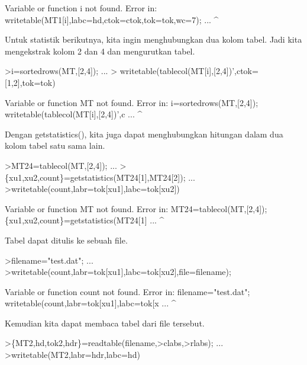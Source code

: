 \documentclass[a4paper,10pt]{article}
\begin{document}
\begin{eulernotebook}
\begin{euleroutput}
  Variable or function i not found.
  Error in:
  writetable(MT1[i],labc=hd,ctok=ctok,tok=tok,wc=7); ...
                  ^
\end{euleroutput}
\begin{eulercomment}
Untuk statistik berikutnya, kita ingin menghubungkan dua kolom tabel.
Jadi kita mengekstrak kolom 2 dan 4 dan mengurutkan tabel.
\end{eulercomment}
\begin{eulerprompt}
>i=sortedrows(MT,[2,4]);  ...
>  writetable(tablecol(MT[i],[2,4])',ctok=[1,2],tok=tok)
\end{eulerprompt}
\begin{euleroutput}
  Variable or function MT not found.
  Error in:
  i=sortedrows(MT,[2,4]);    writetable(tablecol(MT[i],[2,4])',c ...
                 ^
\end{euleroutput}
\begin{eulercomment}
Dengan getstatistics(), kita juga dapat menghubungkan hitungan dalam
dua kolom tabel satu sama lain.
\end{eulercomment}
\begin{eulerprompt}
>MT24=tablecol(MT,[2,4]); ...
>\{xu1,xu2,count\}=getstatistics(MT24[1],MT24[2]); ...
>writetable(count,labr=tok[xu1],labc=tok[xu2])
\end{eulerprompt}
\begin{euleroutput}
  Variable or function MT not found.
  Error in:
  MT24=tablecol(MT,[2,4]); \{xu1,xu2,count\}=getstatistics(MT24[1] ...
                  ^
\end{euleroutput}
\begin{eulercomment}
Tabel dapat ditulis ke sebuah file.
\end{eulercomment}
\begin{eulerprompt}
>filename="test.dat"; ...
>writetable(count,labr=tok[xu1],labc=tok[xu2],file=filename);
\end{eulerprompt}
\begin{euleroutput}
  Variable or function count not found.
  Error in:
  filename="test.dat"; writetable(count,labr=tok[xu1],labc=tok[x ...
                                       ^
\end{euleroutput}
\begin{eulercomment}
Kemudian kita dapat membaca tabel dari file tersebut.
\end{eulercomment}
\begin{eulerprompt}
>\{MT2,hd,tok2,hdr\}=readtable(filename,>clabs,>rlabs); ...
>writetable(MT2,labr=hdr,labc=hd)
\end{eulerprompt}

\end{eulernotebook}
\end{document}
